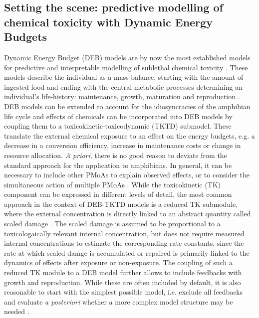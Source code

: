 \documentclass[utf8]{FrontiersinHarvard} %
\begin{document}
\subsection{Setting the scene: predictive modelling of chemical toxicity with Dynamic Energy Budgets}
%
Dynamic Energy Budget (DEB) models are by now the most established models 
for predictive and interpretable modelling of sublethal chemical toxicity 
\citep{jagerSimplifiedDynamicEnergy2012,martinExtrapolatingEcotoxicologicalEffects2013,sherborneModelingSublethalEffects2020,romoliEnvironmentalRiskAssessment2024}. 
These models describe the individual as a mass balance, 
starting with the amount of ingested food and ending with the central metabolic processes determining an 
individual's life-history:  
maintenance, growth, maturation and reproduction \citep{kooijmanDynamicEnergyBudget2010,jagerDEBkissQuestSimplest2013}.
DEB models can be extended to account for the idiosyncracies of the amphibian life cycle 
\citep{romoliDynamicEnergyBudget2025,hansulDynamicEnergyBudget2026} and
effects of chemicals can be incorporated into DEB models by coupling them to a toxicokinetic-toxicodynamic (TKTD) submodel. 
These translate the external chemical exposure to an effect on the energy budgets, 
e.g. a decrease in a conversion efficiency, increase in maintenance costs or change in resource allocation.
\textit{A priori}, there is no good reason to deviate from 
the standard approach for the application to amphibians. 
In general, it can be necessary to include other PMoAs to explain 
observed effects, 
or to consider the simultaneous action of multiple PMoAs \citep{kochMakingSenseLifeHistory2021}.
While the toxicokinetic (TK) component can be expressed in different levels of detail, 
the most common approach in the context of DEB-TKTD models is a reduced TK submodule, where the external concentration is directly linked to an abstract quantity 
called scaled damage \citep{jagerRevisitingSimplifiedDEBtox2020}. 
The scaled damage is assumed to be proportional to a toxicologaically relevant internal concentration, 
but does not require measured internal concentrations to estimate the corresponding rate constants, 
since the rate at which scaled damge is accumulated or repaired is primarily linked to the dynamics of effects after exposure or non-exposure. 
The coupling of such a reduced TK module to a DEB model further allows to include feedbacks with growth and reproduction. 
While these are often included by default, it is also reasonable to start with the simplest possible model, i.e. exclude all feedbacks 
and evaluate \textit{a posteriori} whether a more complex model structure may be needed \citep{jagerRevisitingSimplifiedDEBtox2020,efsapanelonplantprotectionproductsandtheirresiduespprScientificOpinionState2018a}. 
\end{document}
